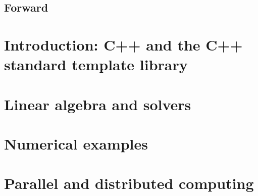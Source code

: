 \documentclass[11pt,fleqn]{book} %
\begin{document}
\tableofcontents %

\cleardoublepage %

\pagestyle{fancy} %

\chapter*{Forward}


\part{Introduction: C++ and the C++ standard template library}




\part{Linear algebra and solvers}



\part{Numerical examples}
\label{part:numerical:examples}



\part{Parallel and distributed computing}
\end{document}
